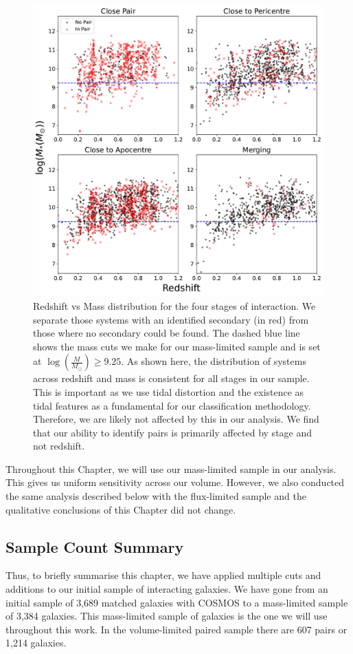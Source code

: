 \begin{figure}
\centering
\includegraphics[width=\textwidth]{Chapter3/figures/redshift-limitations.pdf}
\caption[Redshift vs Mass distribution for each stage of interaction we have defined.]{Redshift vs Mass distribution for the four stages of interaction. We separate those systems with an identified secondary (in red) from those where no secondary could be found. The dashed blue line shows the mass cuts we make for our mass-limited sample and is set at $\log(\frac{M}{M_\odot}) \geq 9.25$. As shown here, the distribution of systems across redshift and mass is consistent for all stages in our sample. This is important as we use tidal distortion and the existence as tidal features as a fundamental for our classification methodology. Therefore, we are likely not affected by this in our analysis. We find that our ability to identify pairs is primarily affected by stage and not redshift.}
\label{fig:redshift_selection}
\end{figure}

Throughout this Chapter, we will use our mass-limited sample in our analysis. This gives us uniform sensitivity across our volume. However, we also conducted the same analysis described below with the flux-limited sample and the qualitative conclusions of this Chapter did not change.

\subsection{Sample Count Summary}\label{sec:sample-summary}
\noindent Thus, to briefly summarise this chapter, we have applied multiple cuts and additions to our initial sample of interacting galaxies. We have gone from an initial sample of 3,689 matched galaxies with COSMOS to a mass-limited sample of 3,384 galaxies. This mass-limited sample of galaxies is the one we will use throughout this work. In the volume-limited paired sample there are 607 pairs or 1,214 galaxies.

